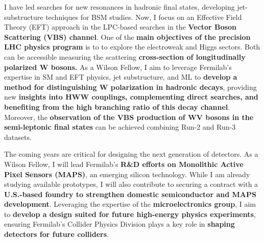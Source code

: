 {\begin{flushleft}
I have led searches for new resonances in hadronic final states, developing jet-substructure techniques for BSM studies. Now, I focus on an Effective Field Theory (EFT) approach in the LPC-based searches in the {\bf Vector Boson Scattering (VBS) channel}. One of the {\bf main objectives of the precision LHC physics program} is to to explore the electroweak and Higgs sectors. Both can be accessible measuring the scattering {\bf cross-section of longitudinally polarized W bosons.} As a Wilson Fellow, I aim to leverage Fermilab’s expertise in SM and EFT physics, jet substructure, and ML to {\bf develop a method for distinguishing W polarization in hadronic decays}, providing new {\bf insights into HWW couplings, complementing direct searches, and benefiting from the high branching ratio of this decay channel}. Moreover, the {\bf observation of the VBS production of WV bosons in the semi-leptonic final states} can be achieved combining Run-2 and Run-3 datasets.

The coming years are critical for designing the next generation of detectors. As a Wilson Fellow, I will lead Fermilab’s {\bf R\&D efforts on Monolithic Active Pixel Sensors (MAPS)}, an emerging silicon technology. While I am already studying available prototypes, I will also contribute to securing a contract with a {\bf U.S.-based foundry to strengthen domestic semiconductor and MAPS development}. Leveraging the expertise of the {\bf microelectronics group}, I aim to {\bf develop a design suited for future high-energy physics experiments}, ensuring Fermilab’s Collider Physics Division plays a key role in {\bf shaping detectors for future colliders}.



\end{flushleft}}
